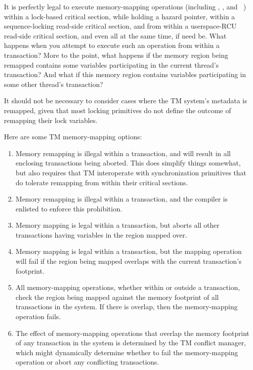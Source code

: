It is perfectly legal to execute memory-mapping operations (including
, , and ~\cite{TheOpenGroup1997SUS})
within a lock-based critical section, while holding a hazard pointer,
within a sequence-locking read-side critical section, and from within a
userspace-RCU read-side critical section, and even all at the same time,
if need be.
What happens when you attempt to execute such an operation from within
a transaction?
More to the point, what happens if the memory region being remapped
contains some variables participating in the current thread's transaction?
And what if this memory region contains variables participating in some
other thread's transaction?

It should not be necessary to consider cases where the TM system's
metadata is remapped, given that most locking primitives do not define
the outcome of remapping their lock variables.

Here are some TM memory-mapping options:

\begin{enumerate}
\item	Memory remapping is illegal within a transaction, and will result
	in all enclosing transactions being aborted.
	This does simplify things somewhat, but also requires that TM
	interoperate with synchronization primitives that do tolerate
	remapping from within their critical sections.
\item	Memory remapping is illegal within a transaction, and the
	compiler is enlisted to enforce this prohibition.
\item	Memory mapping is legal within a transaction, but aborts all
	other transactions having variables in the region mapped over.
\item	Memory mapping is legal within a transaction, but the mapping
	operation will fail if the region being mapped overlaps with
	the current transaction's footprint.
\item	All memory-mapping operations, whether within or outside a
	transaction, check the region being mapped against the memory
	footprint of all transactions in the system.
	If there is overlap, then the memory-mapping operation fails.
\item	The effect of memory-mapping operations that overlap the memory
	footprint of any transaction in the system is determined by the
	TM conflict manager, which might dynamically determine whether
	to fail the memory-mapping operation or abort any conflicting
	transactions.
\end{enumerate}

